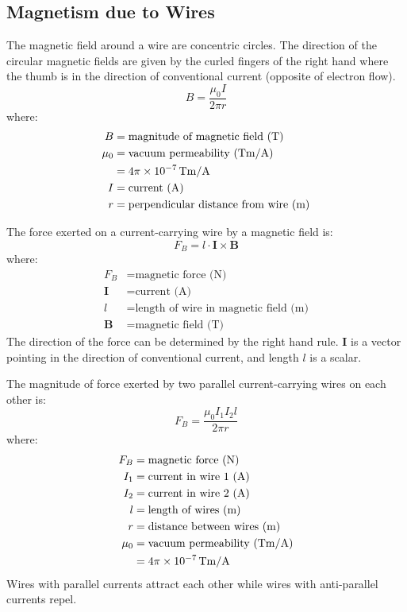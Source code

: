 \documentclass{article}
\newcommand{\theorem}[2]{\begin{tcolorbox}[title={#1},colback=blue!5!white,colframe=blue!75!black,parbox=false] #2 \end{tcolorbox}}
\begin{document}
\subsection{Magnetism due to Wires}

\theorem{Direction and magnitude of magnetic field due to wires}{
	The magnetic field around a wire are concentric circles. The direction of the circular magnetic fields are given by the curled fingers of the right hand where the thumb is in the direction of conventional current (opposite of electron flow).
	\begin{equation*}
		B=\frac{\mu_0 I}{2\pi r}
	\end{equation*}
	where:
	\begin{align*}
		B&=\text{magnitude of magnetic field (T)} \\
		\mu_0&=\text{vacuum permeability (\si{Tm/A})} \\
			 &=4\pi\times 10^{-7}\,\si{Tm/A} \\
		I&=\text{current (A)} \\
		r&=\text{perpendicular distance from wire (m)}
	\end{align*}
}

\theorem{Magnetic force on current-carrying wire}{
	The force exerted on a current-carrying wire by a magnetic field is:
	\begin{equation*}
	    F_B=l\cdot \mathbf I\times \mathbf B
	\end{equation*}
	where:
	\begin{align*}
		F_B&=\text{magnetic force (N)} \\
		\mathbf I&=\text{current (A)} \\
		l&=\text{length of wire in magnetic field (m)} \\
		\mathbf B&=\text{magnetic field (T)}
	\end{align*}
	The direction of the force can be determined by the right hand rule. $\mathbf I$ is a vector pointing in the direction of conventional current, and length $l$ is a scalar.
}

\theorem{Force between two parallel wires}{
	The magnitude of force exerted by two parallel current-carrying wires on each other is:
	\begin{equation*}
	    F_B=\frac{\mu_0 I_1 I_2 l}{2\pi r}
	\end{equation*}
	where:
	\begin{align*}
		F_B&=\text{magnetic force (N)} \\
		I_1&=\text{current in wire 1 (A)} \\
		I_2&=\text{current in wire 2 (A)} \\
		l&=\text{length of wires (m)} \\
		r&=\text{distance between wires (m)} \\
		\mu_0&=\text{vacuum permeability (\si{Tm/A})} \\
			 &=4\pi\times 10^{-7}\,\si{Tm/A}
	\end{align*}
	Wires with parallel currents attract each other while wires with anti-parallel currents repel.
}
\end{document}
